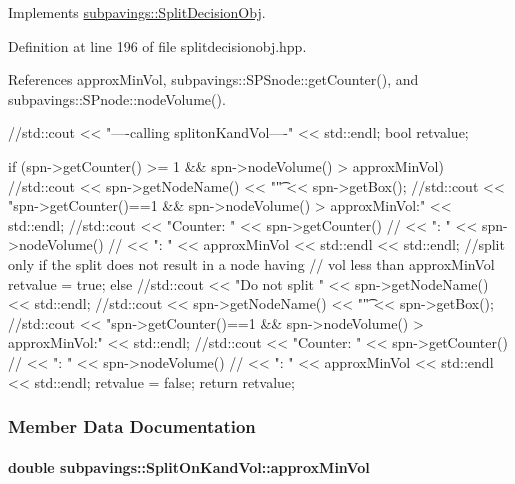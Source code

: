 \-Implements \hyperlink{classsubpavings_1_1SplitDecisionObj_aa1bd2caa4a7bc2890f0c7c7edc4ded4f}{subpavings\-::\-Split\-Decision\-Obj}.



\-Definition at line 196 of file splitdecisionobj.\-hpp.



\-References approx\-Min\-Vol, subpavings\-::\-S\-P\-Snode\-::get\-Counter(), and subpavings\-::\-S\-Pnode\-::node\-Volume().


\begin{DoxyCode}
        {         
        
        //std::cout << "----calling splitonKandVol----" << std::endl;
        bool retvalue;

         if (spn->getCounter() >= 1 && spn->nodeVolume() > approxMinVol)
          {  
             //std::cout << spn->getNodeName() << "\t" << spn->getBox();
            //std::cout << "spn->getCounter()==1 && spn->nodeVolume() >
       approxMinVol:" << std::endl;
            //std::cout << "Counter: " << spn->getCounter() 
             //          << "\tVolume: " << spn->nodeVolume() 
          //         << "\tApproxMinVol: " << approxMinVol << std::endl <<
       std::endl;
             //split only if the split does not result in a node having 
            //  vol less than approxMinVol 
            retvalue = true;
          }
        else {
          //std::cout << "Do not split " << spn->getNodeName() << std::endl;
          //std::cout << spn->getNodeName() << "\t" << spn->getBox();
          //std::cout << "spn->getCounter()==1 && spn->nodeVolume() >
       approxMinVol:" << std::endl;
          //std::cout << "Counter: " << spn->getCounter() 
          //      << "\tVolume: " << spn->nodeVolume() 
          //      << "\tApproxMinVol: " << approxMinVol << std::endl <<
       std::endl;
          retvalue = false;
        }
        return retvalue;
        }
\end{DoxyCode}


\subsubsection{\-Member \-Data \-Documentation}
\hypertarget{classsubpavings_1_1SplitOnKandVol_af3766a409d0c882d23965ab7f5868c6c}{
\paragraph[{approx\-Min\-Vol}]{\setlength{\rightskip}{0pt plus 5cm}double {\bf subpavings\-::\-Split\-On\-Kand\-Vol\-::approx\-Min\-Vol}}}\label{classsubpavings_1_1SplitOnKandVol_af3766a409d0c882d23965ab7f5868c6c}


